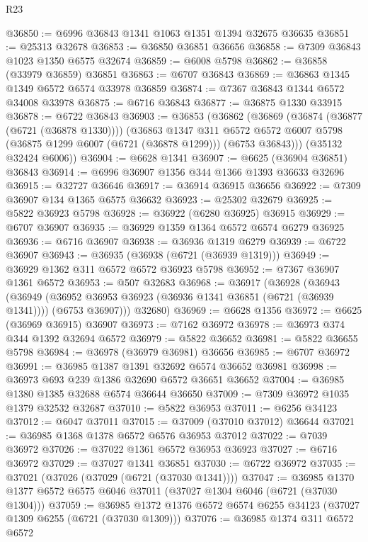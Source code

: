 \begin{lexlean}{R23}
\begin{coremodule}
@36850 := @6996 @36843 @1341 @1063 @1351 @1394 @32675 @36635
@36851 := @25313 @32678
@36853 := @36850 @36851 @36656
@36858 := @7309 @36843 @1023 @1350 @6575 @32674
@36859 := @6008 @5798
@36862 := @36858 (@33979 @36859) @36851
@36863 := @6707 @36843
@36869 := @36863 @1345 @1349 @6572 @6574 @33978 @36859
@36874 := @7367 @36843 @1344 @6572 @34008 @33978
@36875 := @6716 @36843
@36877 := @36875 @1330 @33915
@36878 := @6722 @36843
@36903 := @36853
    (@36862
      (@36869
        (@36874 (@36877 (@6721 (@36878 @1330))))
        (@36863
          @1347
          @311
          @6572
          @6572
          @6007
          @5798
          (@36875 @1299 @6007 (@6721 (@36878 @1299)))
          (@6753 @36843)))
      (@35132 @32424 @6006))
@36904 := @6628 @1341
@36907 := @6625 (@36904 @36851) @36843
@36914 := @6996 @36907 @1356 @344 @1366 @1393 @36633 @32696
@36915 := @32727 @36646
@36917 := @36914 @36915 @36656
@36922 := @7309 @36907 @134 @1365 @6575 @36632
@36923 := @25302 @32679
@36925 := @5822 @36923 @5798
@36928 := @36922 (@6280 @36925) @36915
@36929 := @6707 @36907
@36935 := @36929 @1359 @1364 @6572 @6574 @6279 @36925
@36936 := @6716 @36907
@36938 := @36936 @1319 @6279
@36939 := @6722 @36907
@36943 := @36935 (@36938 (@6721 (@36939 @1319)))
@36949 := @36929 @1362 @311 @6572 @6572 @36923 @5798
@36952 := @7367 @36907 @1361 @6572
@36953 := @507 @32683
@36968 := @36917
    (@36928
      (@36943
        (@36949 (@36952 @36953 @36923 (@36936 @1341 @36851 (@6721 (@36939 @1341)))) (@6753 @36907)))
      @32680)
@36969 := @6628 @1356
@36972 := @6625 (@36969 @36915) @36907
@36973 := @7162 @36972
@36978 := @36973 @374 @344 @1392 @32694 @6572
@36979 := @5822 @36652
@36981 := @5822 @36655 @5798
@36984 := @36978 (@36979 @36981) @36656
@36985 := @6707 @36972
@36991 := @36985 @1387 @1391 @32692 @6574 @36652 @36981
@36998 := @36973 @693 @239 @1386 @32690 @6572 @36651 @36652
@37004 := @36985 @1380 @1385 @32688 @6574 @36644 @36650
@37009 := @7309 @36972 @1035 @1379 @32532 @32687
@37010 := @5822 @36953
@37011 := @6256 @34123
@37012 := @6047 @37011
@37015 := @37009 (@37010 @37012) @36644
@37021 := @36985 @1368 @1378 @6572 @6576 @36953 @37012
@37022 := @7039 @36972
@37026 := @37022 @1361 @6572 @36953 @36923
@37027 := @6716 @36972
@37029 := @37027 @1341 @36851
@37030 := @6722 @36972
@37035 := @37021 (@37026 (@37029 (@6721 (@37030 @1341))))
@37047 := @36985 @1370 @1377 @6572 @6575 @6046 @37011 (@37027 @1304 @6046 (@6721 (@37030 @1304)))
@37059 := @36985 @1372 @1376 @6572 @6574 @6255 @34123 (@37027 @1309 @6255 (@6721 (@37030 @1309)))
@37076 := @36985
    @1374
    @311
    @6572
    @6572

\end{coremodule}
\end{lexlean}
